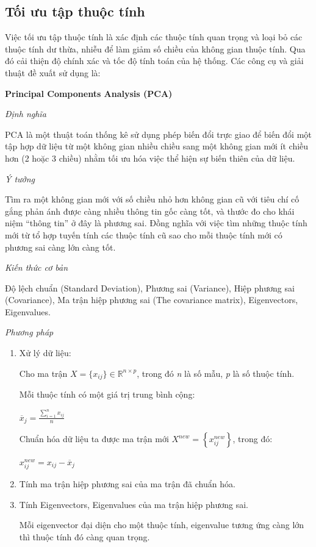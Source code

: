 \documentclass[12pt]{extarticle}
\begin{document}
		\subsection{Tối ưu tập thuộc tính}
			\par Việc tối ưu tập thuộc tính là xác định các thuộc tính quan trọng và loại bỏ các thuộc tính dư thừa, nhiễu để làm giảm số chiều của không  gian thuộc tính. Qua đó cải thiện độ chính xác và tốc độ tính toán của hệ thống. Các công cụ và giải thuật đề xuất sử dụng là:
			\par \textbf{Principal Components Analysis (PCA)}
				\par \textit{Định nghĩa} 
				\par PCA là một thuật toán thống kê sử dụng phép biến đổi trực giao để biến đổi một tập hợp dữ liệu từ một không gian nhiều chiều sang một không gian mới ít chiều hơn (2 hoặc 3 chiều) nhằm tối ưu hóa việc thể hiện sự biến thiên của dữ liệu. 
				\par  \textit{Ý tưởng}
				\par Tìm ra một không gian mới với số chiều nhỏ hơn không gian cũ với tiêu chí cố gắng phản ánh được càng nhiều thông tin gốc càng tốt, và thước đo cho khái niệm “thông tin” ở đây là phương sai. Đồng nghĩa với việc tìm những thuộc tính mới từ tổ hợp tuyến tính các thuộc tính cũ sao cho mỗi thuộc tính mới có phương sai càng lớn càng tốt. 
				\par  \textit{Kiến thức cơ bản}
				\par Độ lệch chuẩn (Standard Deviation), Phương sai (Variance), Hiệp phương sai (Covariance), Ma trận hiệp phương sai (The covariance matrix), Eigenvectors, Eigenvalues.
				\par \textit{Phương pháp}
				\begin{enumerate}
					\item Xử lý dữ liệu:
					\par Cho ma trận ${X= \big\{ x_{ij} \big\}  \in  \mathbb{R}^{n \times p}}$, trong đó \textit{n} là số mẫu, \textit{p} là số thuộc tính.
					\par Mỗi thuộc tính có một giá trị trung bình cộng:
					\begin{center}
						\par ${\overline{x}_{j}=\frac{\sum_{i=1}^n{x_{ij}}}{n}}$
					\end{center}
					\par Chuẩn hóa dữ liệu ta được ma trận mới ${X^{new}=\left\{x_{ij}^{new}\right\}}$, trong đó:
					\begin{center}
						\par ${x_{ij}^{new}=x_{ij}-\overline{x}_{j}}$
					\end{center}
					\item Tính ma trận hiệp phương sai của ma trận đã chuẩn hóa.
					\item Tính Eigenvectors, Eigenvalues của ma trận hiệp phương sai.
					\par Mỗi eigenvector đại diện cho một thuộc tính, eigenvalue tương ứng càng lớn thì thuộc tính đó càng quan trọng.
				\end{enumerate}
\end{document}
